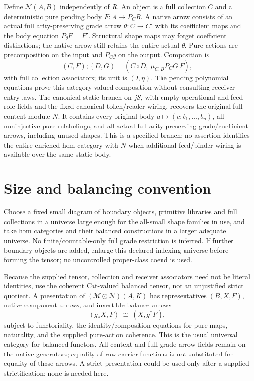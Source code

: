 \documentclass[11pt]{article}
\begin{document}
Define $\mathcal N(A,B)$ independently of $R$. An object is a full collection $C$ and a deterministic pure pending body $F:A\to P_CB$. A native arrow consists of an actual full arity-preserving grade arrow $\theta:C\to C'$ with its coefficient maps and the body equation $P_\theta F=F'$. Structural shape maps may forget coefficient distinctions; the native arrow still retains the entire actual $\theta$. Pure actions are precomposition on the input and $P_Cg$ on the output. Composition is
\[
 (C,F);(D,G)=(C\circ D,\ \mu_{C,D}P_CG\,F),
\]
with full collection associators; its unit is $(I,\eta)$. The pending polynomial equations prove this category-valued composition without consulting receiver entry laws. The canonical static branch on $jS$, with empty operational and feed-role fields and the fixed canonical token/reader wiring, recovers the original full content module $N$. It contains every original body $a\mapsto(c;b_1,\ldots,b_n)$, all noninjective pure relabelings, and all actual full arity-preserving grade/coefficient arrows, including unused shapes. This is a specified branch: no assertion identifies the entire enriched hom category with $N$ when additional feed/binder wiring is available over the same static body.

\section{Size and balancing convention}
Choose a fixed small diagram of boundary objects, primitive libraries and full collections in a universe large enough for the all-small shape families in use, and take hom categories and their balanced constructions in a larger adequate universe. No finite/countable-only full grade restriction is inferred. If further boundary objects are added, enlarge this declared indexing universe before forming the tensor; no uncontrolled proper-class coend is used.

Because the supplied tensor, collection and receiver associators need not be literal identities, use the coherent Cat-valued balanced tensor, not an unjustified strict quotient. A presentation of $(\mathcal M\odot\mathcal N)(A,K)$ has representatives $(B,X,F)$, native component arrows, and invertible balance arrows
\[
 (g_*X,F)\ \cong\ (X,g^*F),
\]
subject to functoriality, the identity/composition equations for pure maps, naturality, and the supplied pure-action coherence. This is the usual universal category for balanced functors. All context and full grade arrow fields remain on the native generators; equality of raw carrier functions is not substituted for equality of those arrows. A strict presentation could be used only after a supplied strictification; none is needed here.
\end{document}
